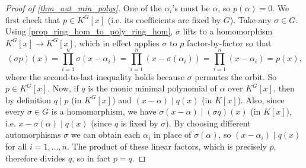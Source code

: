 \begin{proof}[Proof of \cref{thm_aut_min_polys}]
    One of the $\alpha_i$'s must be $\alpha$, so $p(\alpha) = 0$. We first check that $p \in K^G[x]$ (i.e. its coefficients are fixed by $G$). Take any $\sigma \in G$. Using \cref{prop_ring_hom_to_poly_ring_hom}, $\sigma$ lifts to a homomorphism $K^G[x] \to K^G[x]$, which in effect applies $\sigma$ to $p$ factor-by-factor so that
    \[
        (\sigma p)(x) = \prod_{i = 1}^{n} \sigma(x - \alpha_i) = \prod_{i = 1}^{n} (x - \sigma(\alpha_i)) = \prod_{i = 1}^{n} (x - \alpha_i) = p(x),
    \]
    where the second-to-last inequality holds because $\sigma$ permutes the orbit. So $p \in K^G[x]$. Now, if $q$ is the monic minimal polynomial of $\alpha$ over $K^G[x]$, then by definition $q \mid p$ (in $K^G[x]$) and $(x - \alpha) \mid q(x)$ (in $K[x]$). Also, since every $\sigma \in G$ is a homomorphism, we have $\sigma(x - \alpha) \mid (\sigma q)(x)$ (in $K[x]$), i.e. $x - \sigma(\alpha) \mid q(x)$ (since $q$ is fixed by $\sigma$). By choosing different automorphisms $\sigma$ we can obtain each $\alpha_i$ in place of $\sigma(\alpha)$, so $(x - \alpha_i) \mid q(x)$ for all $i = 1, \ldots, n$. The product of these linear factors, which is precisely $p$, therefore divides $q$, so in fact $p = q$.
\end{proof}
